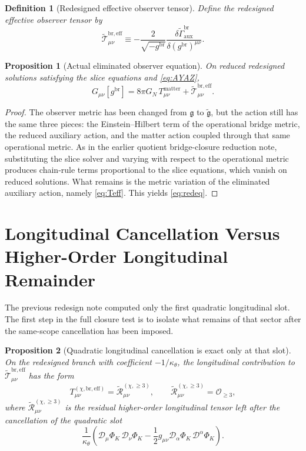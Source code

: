 \documentclass[11pt]{article}
\newcommand{\BridgeMetric}{\mathfrak{g}}
\newcommand{\ReBridge}{\widetilde{\mathfrak{g}}}
\newcommand{\Dperp}{\mathcal D}
\newcommand{\ReEff}{\widetilde{\mathcal T}_{\mu\nu}^{\mathrm{br,eff}}}
\newcommand{\ReLong}{\widetilde{\mathcal R}_{\mu\nu}^{(\chi,\ge 3)}}
\newtheorem{definition}{Definition}
\newtheorem{proposition}{Proposition}
\begin{document}
\begin{definition}[Redesigned effective observer tensor]
\label{def:Teff}
Define the \emph{redesigned effective observer tensor} by
\begin{equation}
\ReEff
\equiv
-\frac{2}{\sqrt{-g^{\mathrm{br}}}}
\frac{\delta\widetilde{\Gamma}_{\mathrm{aux}}^{\mathrm{br}}}{\delta (g^{\mathrm{br}})^{\mu\nu}}.
\label{eq:Teff}
\end{equation}
\end{definition}

\begin{proposition}[Actual eliminated observer equation]
\label{prop:redeq}
On reduced redesigned solutions satisfying the slice equations and \eqref{eq:AYAZ},
\begin{equation}
G_{\mu\nu}[g^{\mathrm{br}}]
=
8\pi G_N\,T_{\mu\nu}^{\mathrm{matter}}
+\ReEff.
\label{eq:redeq}
\end{equation}
\end{proposition}

\begin{proof}
The observer metric has been changed from \(\BridgeMetric\) to \(\ReBridge\), but the action still has the same three pieces: the Einstein--Hilbert term of the operational bridge metric, the reduced auxiliary action, and the matter action coupled through that same operational metric. As in the earlier quotient bridge-closure reduction note, substituting the slice solver and varying with respect to the operational metric produces chain-rule terms proportional to the slice equations, which vanish on reduced solutions. What remains is the metric variation of the eliminated auxiliary action, namely \eqref{eq:Teff}. This yields \eqref{eq:redeq}.
\end{proof}

\section{Longitudinal Cancellation Versus Higher-Order Longitudinal Remainder}

The previous redesign note computed only the first quadratic longitudinal slot. The first step in the full closure test is to isolate what remains of that sector after the same-scope cancellation has been imposed.

\begin{proposition}[Quadratic longitudinal cancellation is exact only at that slot]
\label{prop:longcancel}
On the redesigned branch with coefficient \(-1/\kappa_\theta\), the longitudinal contribution to \(\ReEff\) has the form
\begin{equation}
T_{\mu\nu}^{(\chi,\mathrm{br,eff})}
=
\ReLong,
\qquad
\ReLong=\mathcal O_{\ge 3},
\label{eq:longres}
\end{equation}
where \(\ReLong\) is the residual higher-order longitudinal tensor left after the cancellation of the quadratic slot
\[
\frac{1}{\kappa_\theta}
\left(
\Dperp_\mu\Phi_K\,\Dperp_\nu\Phi_K
-\frac12 g_{\mu\nu}\Dperp_\alpha\Phi_K\,\Dperp^\alpha\Phi_K
\right).
\]
\end{proposition}
\end{document}
